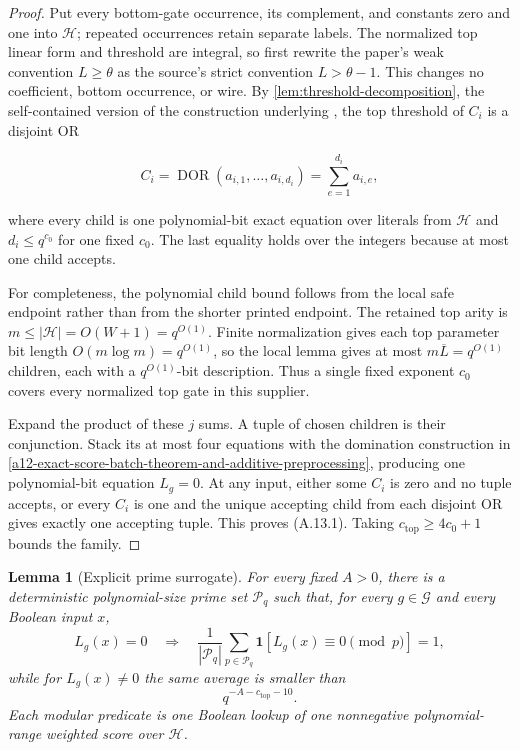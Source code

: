 \documentclass[11pt,letterpaper]{article}
\newcommand{\cref}[1]{\ref{#1}}
\newtheorem{lemma}[theorem]{Lemma}
\theoremstyle{definition}
\theoremstyle{remark}
\begin{document}
\begin{proof} Put every bottom-gate occurrence, its complement, and
constants zero and one into \(\mathcal H\); repeated occurrences retain
separate labels. The normalized top linear form and threshold are
integral, so first rewrite the paper's weak convention
\(L\ge\theta\) as the source's strict convention
\(L>\theta-1\). This changes no coefficient, bottom occurrence, or wire.
By \cref{lem:threshold-decomposition}, the self-contained version of the
construction underlying
\cite[Proposition 18(2) and Appendix B, Lemmas 48--49]{CW19}, the top threshold of \(C_i\)
is a disjoint OR

\[
C_i
{}={}
\operatorname{DOR}(a_{i,1},\ldots,a_{i,d_i})
{}={}
\sum_{e=1}^{d_i}a_{i,e},
\]

where every child is one polynomial-bit exact equation over literals
from \(\mathcal H\) and \(d_i\le q^{c_0}\) for one fixed \(c_0\). The
last equality holds over the integers because at most one child accepts.

For completeness, the polynomial child bound follows from the local safe
endpoint rather than from the shorter printed endpoint. The retained top arity is
\(m\le |\mathcal H|=O(W+1)=q^{O(1)}\). Finite normalization gives each
top parameter bit length \(O(m\log m)=q^{O(1)}\), so the local lemma
gives at most \(m\overline L=q^{O(1)}\) children, each with a
\(q^{O(1)}\)-bit description. Thus a single fixed exponent \(c_0\)
covers every normalized top gate in this supplier.

Expand the product of these \(j\) sums. A tuple of chosen children is
their conjunction. Stack its at most four equations with the domination
construction in \cref{a12-exact-score-batch-theorem-and-additive-preprocessing}, producing one polynomial-bit equation
\(L_g=0\). At any input, either some \(C_i\) is zero and no tuple
accepts, or every \(C_i\) is one and the unique accepting child from
each disjoint OR gives exactly one accepting tuple. This proves
(A.13.1). Taking \(c_{\mathrm{top}}\ge4c_0+1\) bounds the family.
\end{proof}

\begin{lemma}[Explicit prime surrogate]
\label{lem:prime-surrogate}
For every fixed
\(A>0\), there is a deterministic polynomial-size prime set
\(\mathcal P_q\) such that, for every \(g\in\mathcal G\) and every
Boolean input \(x\), \[
L_g(x)=0
\quad\Longrightarrow\quad
\frac1{|\mathcal P_q|}
\sum_{p\in\mathcal P_q}
\mathbf1[L_g(x)\equiv0\pmod p]
=1,
\tag{A.13.2}
\] while for \(L_g(x)\ne0\) the same average is smaller than \[
q^{-A-c_{\mathrm{top}}-10}.
\tag{A.13.3}
\] Each modular predicate is one Boolean lookup of one nonnegative
polynomial-range weighted score over \(\mathcal H\).
\end{lemma}
\end{document}
